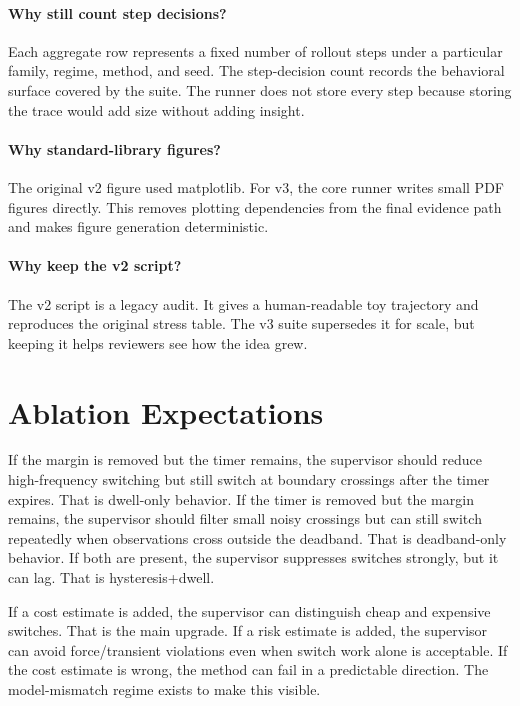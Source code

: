 \documentclass{article}
\begin{document}
\paragraph{Why still count step decisions?}
Each aggregate row represents a fixed number of rollout steps under a particular family, regime, method, and seed.
The step-decision count records the behavioral surface covered by the suite.
The runner does not store every step because storing the trace would add size without adding insight.

\paragraph{Why standard-library figures?}
The original v2 figure used matplotlib.
For v3, the core runner writes small PDF figures directly.
This removes plotting dependencies from the final evidence path and makes figure generation deterministic.

\paragraph{Why keep the v2 script?}
The v2 script is a legacy audit.
It gives a human-readable toy trajectory and reproduces the original stress table.
The v3 suite supersedes it for scale, but keeping it helps reviewers see how the idea grew.

\section{Ablation Expectations}

If the margin is removed but the timer remains, the supervisor should reduce high-frequency switching but still switch at boundary crossings after the timer expires.
That is dwell-only behavior.
If the timer is removed but the margin remains, the supervisor should filter small noisy crossings but can still switch repeatedly when observations cross outside the deadband.
That is deadband-only behavior.
If both are present, the supervisor suppresses switches strongly, but it can lag.
That is hysteresis+dwell.

If a cost estimate is added, the supervisor can distinguish cheap and expensive switches.
That is the main upgrade.
If a risk estimate is added, the supervisor can avoid force/transient violations even when switch work alone is acceptable.
If the cost estimate is wrong, the method can fail in a predictable direction.
The model-mismatch regime exists to make this visible.
\end{document}

